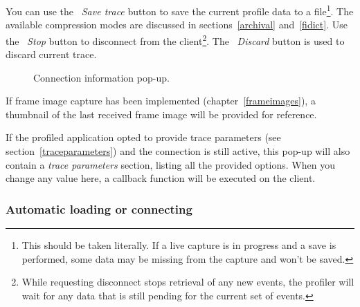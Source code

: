 \documentclass[hidelinks,titlepage,a4paper]{article}
\begin{document}
You can use the \faSave{}~\emph{Save trace} button to save the current profile data to a file\footnote{This should be taken literally. If a live capture is in progress and a save is performed, some data may be missing from the capture and won't be saved.}. The available compression modes are discussed in sections~\ref{archival} and~\ref{fidict}. Use the \faPlug{}~\emph{Stop} button to disconnect from the client\footnote{While requesting disconnect stops retrieval of any new events, the profiler will wait for any data that is still pending for the current set of events.}. The \faExclamationTriangle{}~\emph{Discard} button is used to discard current trace.

\begin{figure}[h]
\centering{}
\caption{Connection information pop-up.}
\label{connectioninfo}
\end{figure}

If frame image capture has been implemented (chapter~\ref{frameimages}), a thumbnail of the last received frame image will be provided for reference.

If the profiled application opted to provide trace parameters (see section~\ref{traceparameters}) and the connection is still active, this pop-up will also contain a \emph{trace parameters} section, listing all the provided options. When you change any value here, a callback function will be executed on the client.

\subsubsection{Automatic loading or connecting}
\end{document}
